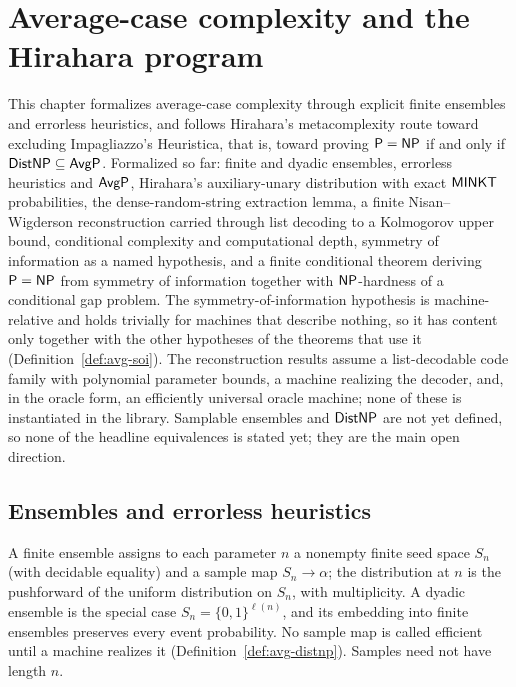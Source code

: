 \chapter{Average-case complexity and the Hirahara program}
\label{chap:averagecase}

This chapter formalizes average-case complexity through explicit finite
ensembles and errorless heuristics, and follows Hirahara's metacomplexity route
toward excluding Impagliazzo's Heuristica, that is, toward proving $\mathsf{P} =
\mathsf{NP}$ if and only if $\mathsf{DistNP} \subseteq \mathsf{AvgP}$. Formalized so far:
finite and dyadic ensembles, errorless heuristics and $\mathsf{AvgP}$, Hirahara's
auxiliary-unary distribution with exact $\mathsf{MINKT}$ probabilities, the
dense-random-string extraction lemma, a finite Nisan--Wigderson reconstruction
carried through list decoding to a Kolmogorov upper bound, conditional
complexity and computational depth, symmetry of information as a named
hypothesis, and a finite conditional theorem deriving $\mathsf{P} = \mathsf{NP}$ from
symmetry of information together with $\mathsf{NP}$-hardness of a conditional gap
problem. The symmetry-of-information hypothesis is machine-relative and holds
trivially for machines that describe nothing, so it has content only together
with the other hypotheses of the theorems that use it
(Definition~\ref{def:avg-soi}). The reconstruction results assume a list-decodable code
family with polynomial parameter bounds, a machine realizing the decoder, and,
in the oracle form, an efficiently universal oracle machine; none of these is
instantiated in the library. Samplable ensembles and $\mathsf{DistNP}$ are not yet
defined, so none of the headline equivalences is stated yet; they are the main
open direction.

\section{Ensembles and errorless heuristics}

\begin{definition}
  \label{def:avg-ensemble}
  \leanok
  A finite ensemble assigns to each parameter $n$ a nonempty finite seed space
  $S_n$ (with decidable equality) and a sample map $S_n \to \alpha$; the
  distribution at $n$ is the pushforward of the uniform distribution on $S_n$,
  with multiplicity. A dyadic
  ensemble is the special case $S_n = \{0,1\}^{\ell(n)}$, and its embedding into
  finite ensembles preserves every event probability. No sample map is called
  efficient until a machine realizes it (Definition~\ref{def:avg-distnp}).
  Samples need not have length $n$.
\end{definition}

